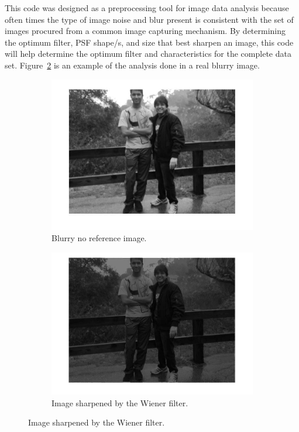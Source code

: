 \noindent This code was designed as a preprocessing tool for image data analysis because often times the type of image noise and blur present is consistent with the set of images procured from a common image capturing mechanism. By determining the optimum filter, PSF shape/s, and size that best sharpen an image, this code will help determine the optimum filter and characteristics for the complete data set. Figure~\ref{fig:friends} is an example of the analysis done in a real blurry image.

\begin{figure}[H]
        \centering
        \begin{subfigure}[b]{0.49\textwidth}
                \centering
                \includegraphics[width=\textwidth]{blur_personal.jpg}
                \caption{Blurry no reference image.}
        \end{subfigure}
        \begin{subfigure}[b]{0.49\textwidth}
                 \centering
                 \includegraphics[width=\textwidth]{sharp_personal_bright.jpg}
                 \caption{Image sharpened by the Wiener filter.}
                 \label{fig:friends}
                       

\end{subfigure}
\end{figure}
